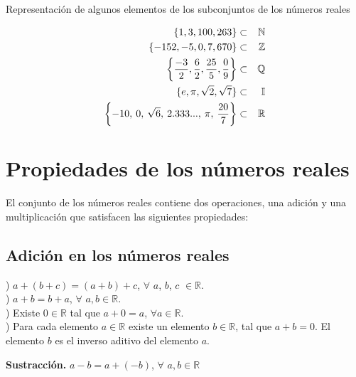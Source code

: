 \begin{myexample}
Representación de algunos elementos de los subconjuntos de los números reales
\end{myexample}

\begin{eqnarray}
\{1,3,100,263\}&\subset & \mathbb{N} \nonumber\\
\{-152,-5,0,7,670\}&\subset & \mathbb{Z} \nonumber\\
\left\{\dfrac{-3}{2},\dfrac{6}{2},\dfrac{25}{5},\dfrac{0}{9}\right\}&\subset & \mathbb{Q} \nonumber\\
\{e,\pi,\sqrt{2},\sqrt{7}\}&\subset & \mathbb{I} \nonumber\\
\left\{-10,\hspace{2px}0,\hspace{2px}\sqrt{6},\hspace{2px}2.333...,\hspace{2px}\pi,\hspace{2px}\dfrac{20}{7}\right\}&\subset & \mathbb{R} \nonumber
\end{eqnarray}

\section{Propiedades de los números reales}
\label{nr0}

El conjunto de los números reales contiene dos operaciones, una adición y una multiplicación que satisfacen las siguientes propiedades:
\subsection{Adición en los números reales}

) $a+(b+c)=(a+b)+c$, $\forall$ $a$, $b$, $c$ $\in \mathbb{R}$.\\

) $a+b=b+a$, $\forall$ $a,b\in \mathbb{R}$.\\

) Existe $0\in\mathbb{R}$ tal que $a+0=a$, $\forall a\in \mathbb{R}$.\\

) Para cada elemento $a \in \mathbb{R}$ existe un elemento $b\in\mathbb{R}$, tal que $a+b=0$. El elemento $b$ es el inverso aditivo del elemento $a$.\\

\begin{mydef}
\textbf{Sustracción.} $a-b=a+(-b)$, $\forall$ $a,b \in \mathbb{R}$ 
\end{mydef}

